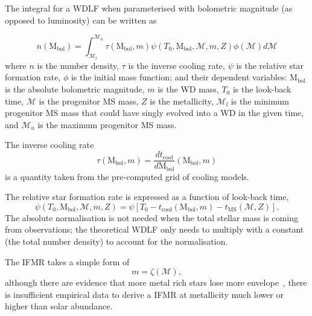 \documentclass[fleqn,usenatbib]{rasti}
\begin{document}
The integral for a WDLF when parameterised with bolometric magnitude (as
opposed to luminosity) can be written as

\begin{equation}
    n(\mathrm{M}_{\mathrm{bol}}) = \int_{\mathcal{M}_l}^{\mathcal{M}_u} \tau(\mathrm{M}_\mathrm{bol}, m) \psi(T_0, \mathrm{M}_\mathrm{bol}, \mathcal{M}, m, Z) \phi(\mathcal{M}) d\mathcal{M}
\end{equation}
where $n$ is the number density, $\tau$ is the inverse cooling rate, $\psi$ is
the relative star formation rate, $\phi$ is the initial mass function; and their
dependent variables: $\mathrm{M}_\mathrm{bol}$ is the absolute bolometric
magnitude, $m$ is the WD mass, $T_0$ is the look-back time, $\mathcal{M}$ is
the progenitor MS mass, $Z$ is the metallicity, $\mathcal{M}_l$ is the minimum
progenitor MS mass that could have singly evolved into a WD in the given time,
and $\mathcal{M}_u$ is the maximum progenitor MS mass.

The inverse cooling rate
\begin{equation}
    \tau(\mathrm{M}_\mathrm{bol}, m) = \dfrac{dt_{\mathrm{cool}}}{d\mathrm{M}_\mathrm{bol}} \left( \mathrm{M}_\mathrm{bol}, m \right)
\end{equation}
is a quantity taken from the pre-computed grid of cooling models. 

The relative star formation rate is expressed as a function of look-back time,
\begin{equation}
    \psi(T_0, \mathrm{M}_\mathrm{bol}, \mathcal{M}, m, Z) = \psi\left[T_0 - t_{\mathrm{cool}}\left(\mathrm{M}_\mathrm{bol}, m\right) - t_{\mathrm{MS}}\left(\mathcal{M}, Z\right)\right].
\end{equation}
The absolute normalisation is not needed when the total stellar mass is coming
from observations; the theoretical WDLF only needs to multiply with a
constant (the total number density) to account for the normalisation.

The IFMR takes a simple form of
\begin{equation}
    m = \zeta(\mathcal{M}),
\end{equation}
although there are evidence that more metal rich stars lose more
envelope~\citep{2007ApJ...671..761K}, there is insufficient empirical data to
derive a IFMR at metallicity much lower or higher than solar abundance.
\end{document}
